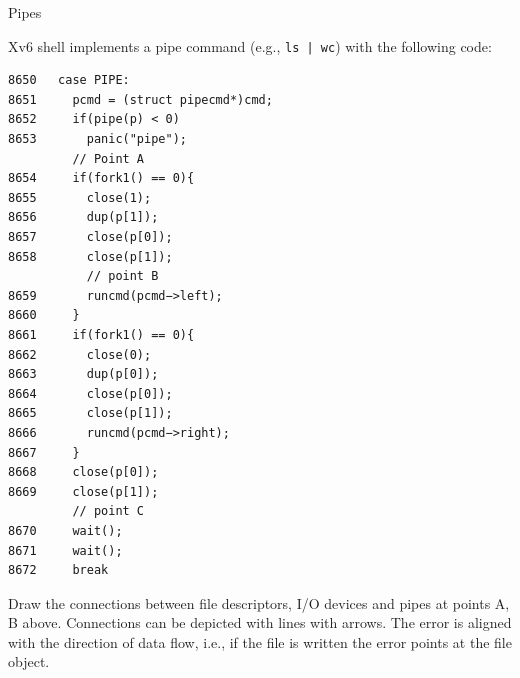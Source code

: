 \documentclass[11pt]{exam}
\begin{document}
\begin{questions}

\addpoints 
\question Pipes

Xv6 shell implements a pipe command (e.g., \texttt{ls | wc}) with the following code: 

\begin{verbatim}
8650   case PIPE:
8651     pcmd = (struct pipecmd*)cmd;
8652     if(pipe(p) < 0)
8653       panic("pipe");
         // Point A
8654     if(fork1() == 0){
8655       close(1);
8656       dup(p[1]);
8657       close(p[0]);
8658       close(p[1]);
           // point B
8659       runcmd(pcmd−>left);
8660     }
8661     if(fork1() == 0){
8662       close(0);
8663       dup(p[0]);
8664       close(p[0]);
8665       close(p[1]);
8666       runcmd(pcmd−>right);
8667     }
8668     close(p[0]);
8669     close(p[1]);
         // point C
8670     wait();
8671     wait();
8672     break
\end{verbatim}

Draw the connections between file descriptors, I/O devices and pipes at points
A, B above.  Connections can be depicted with lines with arrows. The error is
aligned with the direction of data flow, i.e., if the file is written the error
points at the file object. 

\end{questions}
\end{document}
